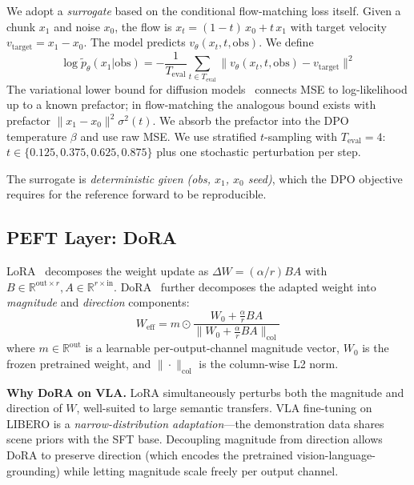 \documentclass{article}
\begin{document}
We adopt a \emph{surrogate} based on the conditional flow-matching loss itself. Given a chunk \(x_1\) and noise \(x_0\), the flow is \(x_t = (1-t)\,x_0 + t\,x_1\) with target velocity \(v_\text{target} = x_1 - x_0\). The model predicts \(v_\theta(x_t, t, \text{obs})\). We define
\begin{equation}
  \log \tilde{p}_\theta(x_1 | \text{obs})
  = -\frac{1}{T_\text{eval}}\sum_{t \in T_\text{eval}}\| v_\theta(x_t, t, \text{obs}) - v_\text{target} \|^2
  \label{eq:surrogate}
\end{equation}
The variational lower bound for diffusion models~\cite{kingma2021variational} connects MSE to log-likelihood up to a known prefactor; in flow-matching the analogous bound exists with prefactor \(\|x_1 - x_0\|^2 \sigma^2(t)\). We absorb the prefactor into the DPO temperature \(\beta\) and use raw MSE. We use stratified \(t\)-sampling with \(T_\text{eval} = 4\): \(t \in \{0.125, 0.375, 0.625, 0.875\}\) plus one stochastic perturbation per step.

The surrogate is \emph{deterministic given (obs, \(x_1\), \(x_0\) seed)}, which the DPO objective requires for the reference forward to be reproducible.

\subsection{PEFT Layer: DoRA}\label{sec:dora}

LoRA~\cite{hu2021lora} decomposes the weight update as \(\Delta W = (\alpha/r) BA\) with \(B \in \mathbb{R}^{\text{out}\times r}, A \in \mathbb{R}^{r\times \text{in}}\). DoRA~\cite{liu2024dora} further decomposes the adapted weight into \emph{magnitude} and \emph{direction} components:
\begin{equation}
  W_\text{eff} = m \odot \frac{W_0 + \frac{\alpha}{r}BA}{\| W_0 + \frac{\alpha}{r}BA \|_\text{col}}
\end{equation}
where \(m \in \mathbb{R}^{\text{out}}\) is a learnable per-output-channel magnitude vector, \(W_0\) is the frozen pretrained weight, and \(\|\cdot\|_\text{col}\) is the column-wise L2 norm.

\textbf{Why DoRA on VLA.} LoRA simultaneously perturbs both the magnitude and direction of \(W\), well-suited to large semantic transfers. VLA fine-tuning on LIBERO is a \emph{narrow-distribution adaptation}---the demonstration data shares scene priors with the SFT base. Decoupling magnitude from direction allows DoRA to preserve direction (which encodes the pretrained vision-language-grounding) while letting magnitude scale freely per output channel.
\end{document}

